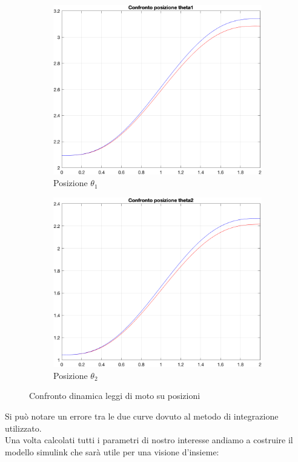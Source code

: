 \begin{figure}[!ht]
\begin{subfigure}{.45\textwidth}
  \centering
  \includegraphics[width=.78\linewidth]{Immagini/Dinamica/confrpost1.png}  
  \caption{Posizione $\theta_1$}
  \label{fig:sub-firsta}
\end{subfigure}
\begin{subfigure}{.45\textwidth}
  \centering
  \includegraphics[width=.78\linewidth]{Immagini/Dinamica/confrpost2.png}  
  \caption{Posizione $\theta_2$}
  \label{fig:sub-seconda}
\end{subfigure}
\caption{Confronto dinamica leggi di moto su posizioni}
\end{figure}
Si può notare un errore tra le due curve dovuto al metodo di integrazione utilizzato.
\\Una volta calcolati tutti i parametri di nostro interesse andiamo a costruire il modello simulink che sarà utile per una visione d'insieme:
